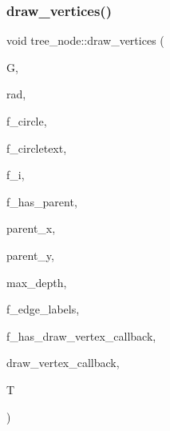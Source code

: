\subsubsection{\texorpdfstring{draw\+\_\+vertices()}{draw\_vertices()}}
{\footnotesize\ttfamily void tree\+\_\+node\+::draw\+\_\+vertices (\begin{DoxyParamCaption}\item[{\mbox{\hyperlink{classmp__graphics}{mp\+\_\+graphics}} \&}]{G,  }\item[{\mbox{\hyperlink{galois_8h_a09fddde158a3a20bd2dcadb609de11dc}{I\+NT}}}]{rad,  }\item[{\mbox{\hyperlink{galois_8h_a09fddde158a3a20bd2dcadb609de11dc}{I\+NT}}}]{f\+\_\+circle,  }\item[{\mbox{\hyperlink{galois_8h_a09fddde158a3a20bd2dcadb609de11dc}{I\+NT}}}]{f\+\_\+circletext,  }\item[{\mbox{\hyperlink{galois_8h_a09fddde158a3a20bd2dcadb609de11dc}{I\+NT}}}]{f\+\_\+i,  }\item[{\mbox{\hyperlink{galois_8h_a09fddde158a3a20bd2dcadb609de11dc}{I\+NT}}}]{f\+\_\+has\+\_\+parent,  }\item[{\mbox{\hyperlink{galois_8h_a09fddde158a3a20bd2dcadb609de11dc}{I\+NT}}}]{parent\+\_\+x,  }\item[{\mbox{\hyperlink{galois_8h_a09fddde158a3a20bd2dcadb609de11dc}{I\+NT}}}]{parent\+\_\+y,  }\item[{\mbox{\hyperlink{galois_8h_a09fddde158a3a20bd2dcadb609de11dc}{I\+NT}}}]{max\+\_\+depth,  }\item[{\mbox{\hyperlink{galois_8h_a09fddde158a3a20bd2dcadb609de11dc}{I\+NT}}}]{f\+\_\+edge\+\_\+labels,  }\item[{\mbox{\hyperlink{galois_8h_a09fddde158a3a20bd2dcadb609de11dc}{I\+NT}}}]{f\+\_\+has\+\_\+draw\+\_\+vertex\+\_\+callback,  }\item[{void($\ast$)(\mbox{\hyperlink{classtree}{tree}} $\ast$\mbox{\hyperlink{pentomino__5x5_8_c_a2b44a927c3e8a68f69f9f943c32c696d}{T}}, \mbox{\hyperlink{classmp__graphics}{mp\+\_\+graphics}} $\ast$G, \mbox{\hyperlink{galois_8h_a09fddde158a3a20bd2dcadb609de11dc}{I\+NT}} $\ast$\mbox{\hyperlink{simeon_8_c_aeb3f3030944801b163bc3b829a7f6710}{v}}, \mbox{\hyperlink{galois_8h_a09fddde158a3a20bd2dcadb609de11dc}{I\+NT}} layer, \mbox{\hyperlink{classtree__node}{tree\+\_\+node}} $\ast$\mbox{\hyperlink{_a_p_p_s_2_t_d_o_2packing_8_c_a0240ac851181b84ac374872dc5434ee4}{N}}, \mbox{\hyperlink{galois_8h_a09fddde158a3a20bd2dcadb609de11dc}{I\+NT}} \mbox{\hyperlink{alphabet2_8_c_a6150e0515f7202e2fb518f7206ed97dc}{x}}, \mbox{\hyperlink{galois_8h_a09fddde158a3a20bd2dcadb609de11dc}{I\+NT}} \mbox{\hyperlink{alphabet2_8_c_a0a2f84ed7838f07779ae24c5a9086d33}{y}}, \mbox{\hyperlink{galois_8h_a09fddde158a3a20bd2dcadb609de11dc}{I\+NT}} dx, \mbox{\hyperlink{galois_8h_a09fddde158a3a20bd2dcadb609de11dc}{I\+NT}} dy)}]{draw\+\_\+vertex\+\_\+callback,  }\item[{\mbox{\hyperlink{classtree}{tree}} $\ast$}]{T }\end{DoxyParamCaption})}

